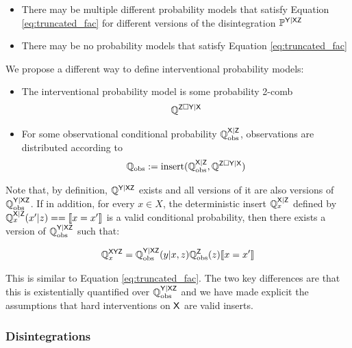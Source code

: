 \begin{itemize}
	\item There may be multiple different probability models that satisfy Equation \ref{eq:truncated_fac} for different versions of the disintegration $\mathbb{P}^{\mathsf{Y|XZ}}$
	\item There may be no probability models that satisfy Equation \ref{eq:truncated_fac}
\end{itemize}

We propose a different way to define interventional probability models:

\begin{itemize}
	\item The interventional probability model is some probability 2-comb 
	\begin{align}
		\mathbb{Q}^{\mathsf{Z}\square\mathsf{Y}|\mathsf{X}}
	\end{align}
	\item For some observational conditional probability $\mathbb{Q}_{\text{obs}}^{\mathsf{X}|\mathsf{Z}}$, observations are distributed according to 
	\begin{align}
	\mathbb{Q}_{\text{obs}}:=\text{insert}(\mathbb{Q}_{\text{obs}}^{\mathsf{X}|\mathsf{Z}},\mathbb{Q}^{\mathsf{Z}\square\mathsf{Y}|\mathsf{X}})\label{eq:int_to_obs}
	\end{align}
\end{itemize}

Note that, by definition, $\mathbb{Q}^{\mathsf{Y}|\mathsf{XZ}}$ exists and all versions of it are also versions of $\mathbb{Q}_{\text{obs}}^{\mathsf{Y}|\mathsf{XZ}}$. If in addition, for every $x\in X$, the deterministic insert $\mathbb{Q}_{x}^{\mathsf{X}|\mathsf{Z}}$ defined by $\mathbb{Q}_{x}^{\mathsf{X}|\mathsf{Z}}(x'|z) == \llbracket x=x' \rrbracket$ is a valid conditional probability, then there exists a version of $\mathbb{Q}_{\text{obs}}^{\mathsf{Y}|\mathsf{XZ}}$ such that:

\begin{align}
	\mathbb{Q}_x^{\mathsf{XYZ}} = \mathbb{Q}_{\text{obs}}^{\mathsf{Y|XZ}}(y|x,z)\mathbb{Q}_{\text{obs}}^{\mathsf{Z}}(z)\llbracket x=x' \rrbracket
\end{align}

This is similar to Equation \ref{eq:truncated_fac}. The two key differences are that this is existentially quantified over $\mathbb{Q}_{\text{obs}}^{\mathsf{Y|XZ}}$ and we have made explicit the assumptions that hard interventions on $\mathsf{X}$ are valid inserts.

\subsubsection{Disintegrations}

